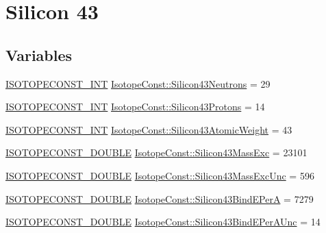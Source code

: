 \hypertarget{group___isotope_const-_silicon-_si43}{}\section{Silicon 43}
\label{group___isotope_const-_silicon-_si43}
\subsection*{Variables}
\begin{DoxyCompactItemize}
\item 
\mbox{\hyperlink{group___isotope_const-_macros_ga5f18360b3e99483a35c32d789e62621c}{I\+S\+O\+T\+O\+P\+E\+C\+O\+N\+S\+T\+\_\+\+I\+NT}} \mbox{\hyperlink{group___isotope_const-_silicon-_si43_gaf3d9e0227aabbda7d12e21a9d557c71b}{Isotope\+Const\+::\+Silicon43\+Neutrons}} = 29
\item 
\mbox{\hyperlink{group___isotope_const-_macros_ga5f18360b3e99483a35c32d789e62621c}{I\+S\+O\+T\+O\+P\+E\+C\+O\+N\+S\+T\+\_\+\+I\+NT}} \mbox{\hyperlink{group___isotope_const-_silicon-_si43_ga452aad5fe2135f916518d881fc9a44cc}{Isotope\+Const\+::\+Silicon43\+Protons}} = 14
\item 
\mbox{\hyperlink{group___isotope_const-_macros_ga5f18360b3e99483a35c32d789e62621c}{I\+S\+O\+T\+O\+P\+E\+C\+O\+N\+S\+T\+\_\+\+I\+NT}} \mbox{\hyperlink{group___isotope_const-_silicon-_si43_ga78da50c8e372d4f4d1375a2f36af4efa}{Isotope\+Const\+::\+Silicon43\+Atomic\+Weight}} = 43
\item 
\mbox{\hyperlink{group___isotope_const-_macros_ga8f45a7272ce02c0b4c65c44636ed719a}{I\+S\+O\+T\+O\+P\+E\+C\+O\+N\+S\+T\+\_\+\+D\+O\+U\+B\+LE}} \mbox{\hyperlink{group___isotope_const-_silicon-_si43_ga5a1d3ba1c474ea1b5d1d195046d10e4e}{Isotope\+Const\+::\+Silicon43\+Mass\+Exc}} = 23101
\item 
\mbox{\hyperlink{group___isotope_const-_macros_ga8f45a7272ce02c0b4c65c44636ed719a}{I\+S\+O\+T\+O\+P\+E\+C\+O\+N\+S\+T\+\_\+\+D\+O\+U\+B\+LE}} \mbox{\hyperlink{group___isotope_const-_silicon-_si43_gaa9d9c7b612687e5ddb2f2b5958523ca4}{Isotope\+Const\+::\+Silicon43\+Mass\+Exc\+Unc}} = 596
\item 
\mbox{\hyperlink{group___isotope_const-_macros_ga8f45a7272ce02c0b4c65c44636ed719a}{I\+S\+O\+T\+O\+P\+E\+C\+O\+N\+S\+T\+\_\+\+D\+O\+U\+B\+LE}} \mbox{\hyperlink{group___isotope_const-_silicon-_si43_gabe46708f4b5806e59be9d58ba4e32299}{Isotope\+Const\+::\+Silicon43\+Bind\+E\+PerA}} = 7279
\item 
\mbox{\hyperlink{group___isotope_const-_macros_ga8f45a7272ce02c0b4c65c44636ed719a}{I\+S\+O\+T\+O\+P\+E\+C\+O\+N\+S\+T\+\_\+\+D\+O\+U\+B\+LE}} \mbox{\hyperlink{group___isotope_const-_silicon-_si43_gaa71578d121810f8e69e4a9d4627f2333}{Isotope\+Const\+::\+Silicon43\+Bind\+E\+Per\+A\+Unc}} = 14

\end{DoxyCompactItemize}
